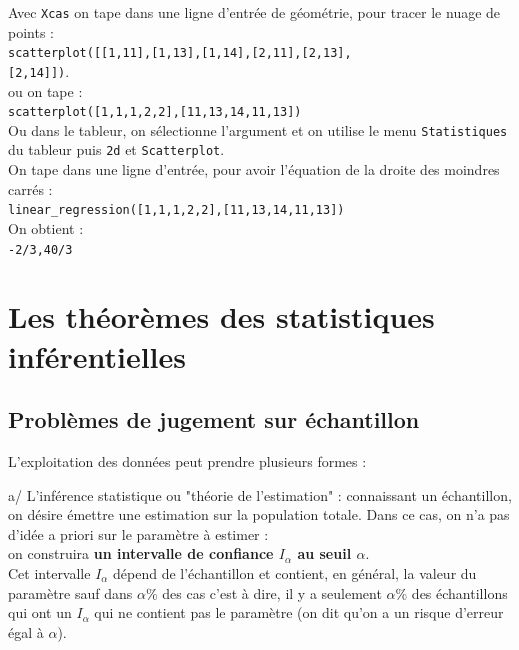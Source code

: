 \documentclass[a4paper,11pt]{book}
\begin{document}
Avec {\tt Xcas} on tape dans une ligne d'entr\'ee de g\'eom\'etrie, pour tracer
le nuage de points :\\
{\tt scatterplot([[1,11],[1,13],[1,14],[2,11],[2,13],}\\
{\tt [2,14]])}.\\
ou on tape : \\
{\tt scatterplot([1,1,1,2,2],[11,13,14,11,13])}\\
Ou dans le tableur, on s\'electionne l'argument et on utilise le menu 
{\tt Statistiques} du tableur puis {\tt 2d} et {\tt Scatterplot}.\\
On tape dans une ligne d'entr\'ee, pour avoir l'\'equation de la droite des 
moindres carr\'es :\\
{\tt linear\_regression([1,1,1,2,2],[11,13,14,11,13])}\\
On obtient :\\
{\tt -2/3,40/3}


\section{Les th\'eor\`emes des statistiques inf\'erentielles}
\subsection{Probl\`emes de jugement sur \'echantillon}
L'exploitation des donn\'ees peut prendre plusieurs formes :

a/ L'inf\'erence statistique ou "th\'eorie de l'estimation" : connaissant un 
\'echantillon, on d\'esire \'emettre une estimation sur la population totale.
Dans ce cas, on n'a pas d'id\'ee a priori sur le param\`etre \`a estimer : \\
on construira
{\bf un intervalle de confiance  $I_\alpha$ au seuil $\alpha$}.\\
Cet intervalle $I_\alpha$ d\'epend de l'\'echantillon et contient, en 
g\'en\'eral, la valeur du param\`etre sauf dans $\alpha \%$ des cas c'est \`a
dire, il y a 
seulement $\alpha \%$ des \'echantillons qui ont un $I_\alpha$ qui ne contient
pas le param\`etre (on dit 
qu'on a un risque d'erreur \'egal \`a $\alpha$).
\end{document}
